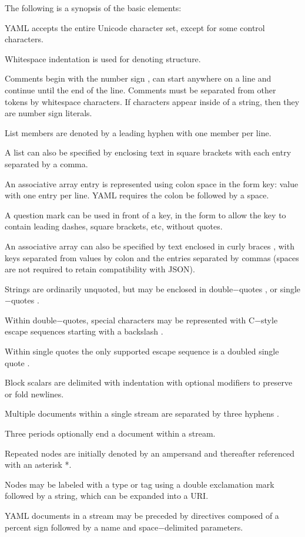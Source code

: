 The following is a synopsis of the basic elements:
\bit
\item YAML accepts the entire Unicode character set, except for some control characters.
\item Whitespace indentation is used for denoting structure.
\item Comments begin with the number sign \code{$\#$}, can start anywhere on a line and continue until the end of the
line. Comments must be separated from other tokens by whitespace characters. If \code{$\#$} characters appear inside
of a string, then they are number sign \code{$\#$} literals.
\item List members are denoted by a leading hyphen \code{$-$} with one member per line.
\item A list can also be specified by enclosing text in square brackets \code{[$\ldots$]} with each entry separated by a
comma.
\item An associative array entry is represented using colon space in the form key: value with one entry per line. YAML
requires the colon be followed by a space.
\item A question mark can be used in front of a key, in the form  to allow the key to contain leading
dashes, square brackets, etc, without quotes.
\item An associative array can also be specified by text enclosed in curly braces \code{$\{\ldots\}$}, with keys
separated from
values by colon and the entries separated by commas (spaces are not required to retain compatibility with JSON).
\item Strings are ordinarily unquoted, but may be enclosed in double$-$quotes , or single$-$quotes .
\item Within double$-$quotes, special characters may be represented with C$-$style escape sequences starting with a
backslash \code{$\textbackslash$}.
\item Within single quotes the only supported escape sequence is a doubled single quote .
\item Block scalars are delimited with indentation with optional modifiers to preserve \code{|} or fold \code{>}
newlines.
\item Multiple documents within a single stream are separated by three hyphens \code{\texttt{$-${}$-${}$-$}}.
\item Three periods \code{$\ldots$} optionally end a document within a stream.
\item Repeated nodes are initially denoted by an ampersand \code{$\&$} and thereafter referenced with an asterisk *.
\item Nodes may be labeled with a type or tag using a double exclamation mark \code{!!} followed by a string, which can
be expanded into a URI\@.
\item YAML documents in a stream may be preceded by directives composed of a percent sign \code{$\%$} followed by a name
and space$-$delimited parameters.
\eit

